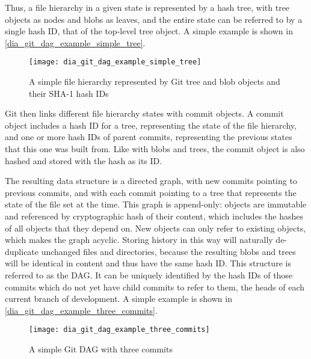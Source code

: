 Thus, a file hierarchy in a given state is represented by a hash tree, with
\gls{tree} objects as nodes and \glspl{blob} as leaves, and the entire state can
be referred to by a single hash ID, that of the top-level \gls{tree} object. A
simple example is shown in \autoref{dia_git_dag_example_simple_tree}.

\begin{figure}[h]
    \centering
    \texttt{[image: dia\_git\_dag\_example\_simple\_tree]}
    \caption{A simple file hierarchy represented by Git tree and blob objects
    and their SHA-1 hash IDs}
    \label{dia_git_dag_example_simple_tree}
\end{figure}

Git then links different file hierarchy states with \gls{commit} objects. A
\gls{commit} object includes a hash ID for a \gls{tree}, representing the state
of the file hierarchy, and one or more hash IDs of parent \glspl{commit},
representing the previous states that this one was built from. Like with
\glspl{blob} and \glspl{tree}, the \gls{commit} object is also hashed and stored
with the hash as its ID.

The resulting data structure is a directed graph, with new \glspl{commit}
pointing to previous \glspl{commit}, and with each \gls{commit} pointing to a
\gls{tree} that represents the state of the file set at the time. This graph is
append-only: objects are immutable and referenced by cryptographic hash of their
content, which includes the hashes of all objects that they depend on. New
objects can only refer to existing objects, which makes the graph acyclic.
Storing history in this way will naturally de-duplicate unchanged files and
directories, because the resulting \glspl{blob} and \glspl{tree} will be
identical in content and thus have the same hash ID. This
 structure is referred to as the
\acrshort{DAG}. It can be uniquely identified by the hash IDs of
those \glspl{commit} which do not yet have child \glspl{commit} to refer to
them, the \glspl{head} of each current \gls{branch} of development. A simple
example is shown in \autoref{dia_git_dag_example_three_commits}.

\begin{figure}[h]
    \centering
    \texttt{[image: dia\_git\_dag\_example\_three\_commits]}
    \caption{A simple Git DAG with three commits}
    \label{dia_git_dag_example_three_commits}
\end{figure}

